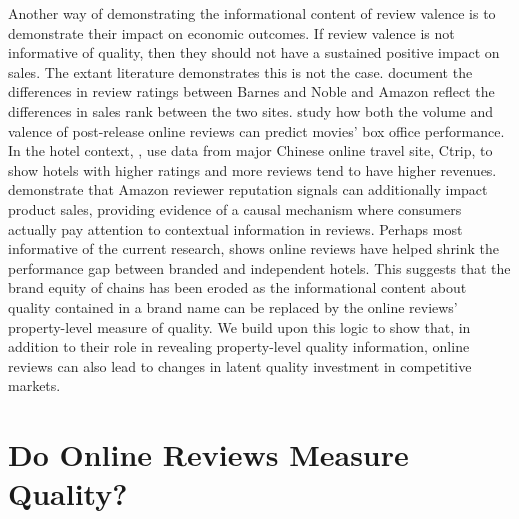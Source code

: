 \documentclass[12pt, leqno]{article}
\begin{document}
Another way of demonstrating the informational content of review valence is to demonstrate their impact on economic outcomes. If review valence is not informative of quality, then they should not have a sustained positive impact on sales. The extant literature demonstrates this is not the case. \citet{chevalier2006effect} document the differences in review ratings between Barnes and Noble and Amazon reflect the differences in sales rank between the two sites. \citet{dellarocas2007exploring} study how both the volume and valence of post-release online reviews can predict movies' box office performance. In the hotel context, \citet{ye2009impact}, use data from major Chinese online travel site, Ctrip, to show hotels with higher ratings and more reviews tend to have higher revenues. \citet{hu2008online} demonstrate that Amazon reviewer reputation signals can additionally impact product sales, providing evidence of a causal mechanism where consumers actually pay attention to contextual information in reviews. Perhaps most informative of the current research, \citet{hollenbeck2018} shows online reviews have helped shrink the performance gap between branded and independent hotels. This suggests that the brand equity of chains has been eroded as the informational content about quality contained in a brand name can be replaced by the online reviews' property-level measure of quality. We build upon this logic to show that, in addition to their role in revealing property-level quality information, online reviews can also lead to changes in latent quality investment in competitive markets.

\section*{Do Online Reviews Measure Quality?} \label{sec:quality}
\end{document}
